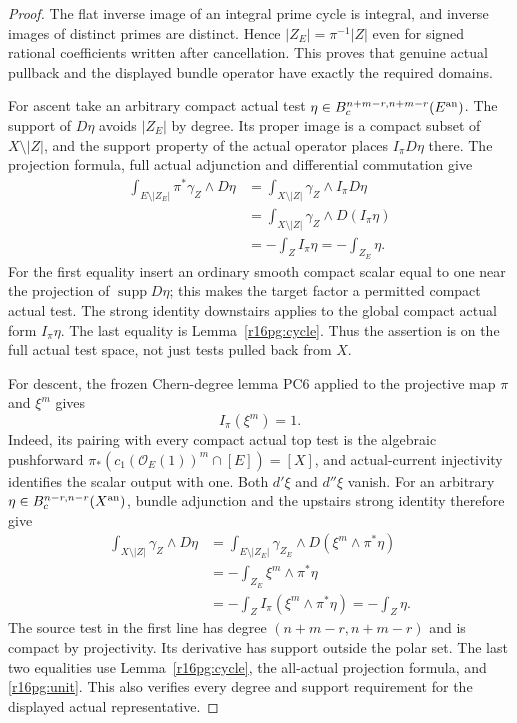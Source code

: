 \begin{proof}
The flat inverse image of an integral prime cycle is integral,
and inverse images of distinct primes are distinct. Hence
$|Z_E|=\pi^{-1}|Z|$ even for signed rational coefficients written
after cancellation. This proves that genuine actual pullback and
the displayed bundle operator have exactly the required domains.

For ascent take an arbitrary compact actual test
$\eta\in B_c^{n+m-r,n+m-r}(E^{\rm an})$. The support of $D\eta$
avoids $|Z_E|$ by degree. Its proper image is a compact subset of
$X\setminus|Z|$, and the support property of the actual operator
places $I_\pi D\eta$ there. The projection formula, full actual
adjunction and differential commutation give
\[
 \begin{split}
 \int_{E\setminus|Z_E|}\pi^*\gamma_Z\wedge D\eta
   &=\int_{X\setminus|Z|}\gamma_Z\wedge I_\pi D\eta\\
   &=\int_{X\setminus|Z|}\gamma_Z\wedge D(I_\pi\eta)\\
   &=-\int_Z I_\pi\eta
    =-\int_{Z_E}\eta.
 \end{split}
 \tag{PG16.7}\label{r16pg:ascent-pairing}
\]
For the first equality insert an ordinary smooth compact scalar
equal to one near the projection of $\operatorname{supp}D\eta$;
this makes the target factor a permitted compact actual test.
The strong identity downstairs applies to the global compact
actual form $I_\pi\eta$. The last equality is
Lemma~\ref{r16pg:cycle}. Thus the assertion is on the full actual
test space, not just tests pulled back from $X$.

For descent, the frozen Chern-degree lemma PC6 applied to the
projective map $\pi$ and $\xi^m$ gives
\[
                             I_\pi(\xi^m)=1.
 \tag{PG16.8}\label{r16pg:unit}
\]
Indeed, its pairing with every compact actual top test is the
algebraic pushforward
$\pi_*(c_1(\mathcal O_E(1))^m\cap[E])=[X]$, and actual-current
injectivity identifies the scalar output with one. Both $d'\xi$
and $d''\xi$ vanish. For an arbitrary
$\eta\in B_c^{n-r,n-r}(X^{\rm an})$, bundle adjunction and the
upstairs strong identity therefore give
\[
 \begin{split}
 \int_{X\setminus|Z|}\gamma_Z\wedge D\eta
   &=\int_{E\setminus|Z_E|}\gamma_{Z_E}
                                  \wedge D(\xi^m\wedge\pi^*\eta)\\
   &=-\int_{Z_E}\xi^m\wedge\pi^*\eta\\
   &=-\int_Z I_\pi(\xi^m\wedge\pi^*\eta)
    =-\int_Z\eta.
 \end{split}
 \tag{PG16.9}\label{r16pg:descent-pairing}
\]
The source test in the first line has degree
$(n+m-r,n+m-r)$ and is compact by projectivity. Its derivative
has support outside the polar set. The last two equalities use
Lemma~\ref{r16pg:cycle}, the all-actual projection formula, and
\eqref{r16pg:unit}. This also verifies every degree and support
requirement for the displayed actual representative.
\end{proof}

